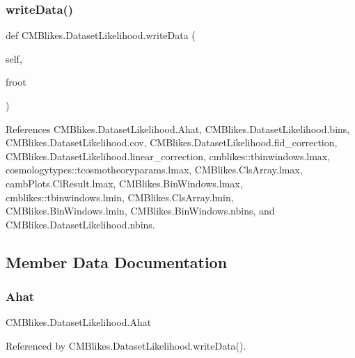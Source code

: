 \subsubsection{\texorpdfstring{write\+Data()}{writeData()}}
{\footnotesize\ttfamily def C\+M\+Blikes.\+Dataset\+Likelihood.\+write\+Data (\begin{DoxyParamCaption}\item[{}]{self,  }\item[{}]{froot }\end{DoxyParamCaption})}



References C\+M\+Blikes.\+Dataset\+Likelihood.\+Ahat, C\+M\+Blikes.\+Dataset\+Likelihood.\+bins, C\+M\+Blikes.\+Dataset\+Likelihood.\+cov, C\+M\+Blikes.\+Dataset\+Likelihood.\+fid\+\_\+correction, C\+M\+Blikes.\+Dataset\+Likelihood.\+linear\+\_\+correction, cmblikes\+::tbinwindows.\+lmax, cosmologytypes\+::tcosmotheoryparams.\+lmax, C\+M\+Blikes.\+Cls\+Array.\+lmax, camb\+Plots.\+Cl\+Result.\+lmax, C\+M\+Blikes.\+Bin\+Windows.\+lmax, cmblikes\+::tbinwindows.\+lmin, C\+M\+Blikes.\+Cls\+Array.\+lmin, C\+M\+Blikes.\+Bin\+Windows.\+lmin, C\+M\+Blikes.\+Bin\+Windows.\+nbins, and C\+M\+Blikes.\+Dataset\+Likelihood.\+nbins.



\subsection{Member Data Documentation}
\mbox{\label{classCMBlikes_1_1DatasetLikelihood_a0dedde4f03a33eefca5eeb6e05c7859e}} 
\subsubsection{\texorpdfstring{Ahat}{Ahat}}
{\footnotesize\ttfamily C\+M\+Blikes.\+Dataset\+Likelihood.\+Ahat}



Referenced by C\+M\+Blikes.\+Dataset\+Likelihood.\+write\+Data().

\mbox{\label{classCMBlikes_1_1DatasetLikelihood_ab32573fca0f23cfcbb3283081ead87b3}} 
